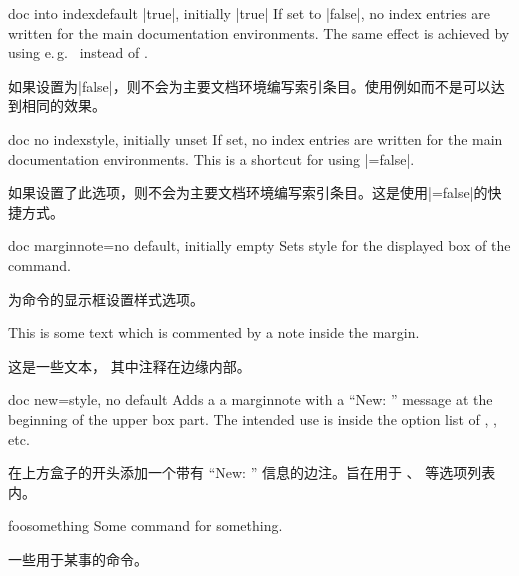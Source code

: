 
\begin{docTcbKey}{doc into index}{}{default |true|, initially |true|}
If set to |false|, no index entries are written for the main documentation
environments. The same effect is achieved by using e.\,g.\ 
instead of .

如果设置为|false|，则不会为主要文档环境编写索引条目。使用例如而不是可以达到相同的效果。
\end{docTcbKey}


\begin{docTcbKey}[][doc new={2020-04-22}]{doc no index}{}{style, initially unset}
If set, no index entries are written for the main documentation
environments. This is a shortcut for using |=false|.

如果设置了此选项，则不会为主要文档环境编写索引条目。这是使用|=false|的快捷方式。
\end{docTcbKey}

\begin{docTcbKey}[][doc new=2014-09-19]{doc marginnote}{=}{no default, initially empty}
Sets style  for the displayed box of the  command.

为命令的显示框设置样式选项。
\begin{dispExample}
%
This is some text
which is commented by a note inside the margin.

这是一些文本， 其中注释在边缘内部。
\end{dispExample}
\end{docTcbKey}

\begin{docTcbKey}[][doc new=2014-09-19]{doc new}{=}{style, no default}
Adds a a marginnote with a \enquote{New: } message at the beginning of
the upper box part. The intended use is inside the option list of
, , etc.

在上方盒子的开头添加一个带有 \enquote{New: } 信息的边注。旨在用于 、 等选项列表内。 
\makeatletter\renewcommand*{\tcbdocnew}[1]{\kvtcb@text@new: #1}\makeatother%
\begin{dispExample}
\begin{docCommand}[doc new=2000-01-01]{foosomething}{}
Some command for something.

一些用于某事的命令。
\end{docCommand}
\end{dispExample}
\end{docTcbKey}


